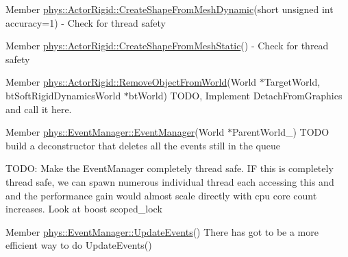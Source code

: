 \label{dd/da0/todo__todo000002}
\hypertarget{dd/da0/todo__todo000002}{}
 
\begin{DoxyDescription}
\item[Member \hyperlink{classphys_1_1ActorRigid_aab4a408ce0724be6adf4c9f51f55f8a1}{phys::ActorRigid::CreateShapeFromMeshDynamic}(short unsigned int accuracy=1) ]-\/ Check for thread safety 
\end{DoxyDescription}

\label{dd/da0/todo__todo000003}
\hypertarget{dd/da0/todo__todo000003}{}
 
\begin{DoxyDescription}
\item[Member \hyperlink{classphys_1_1ActorRigid_a84554dcaaf2475ba0ec7dcb9235050ac}{phys::ActorRigid::CreateShapeFromMeshStatic}() ]-\/ Check for thread safety 
\end{DoxyDescription}

\label{dd/da0/todo__todo000001}
\hypertarget{dd/da0/todo__todo000001}{}
 
\begin{DoxyDescription}
\item[Member \hyperlink{classphys_1_1ActorRigid_a74a4eaa5491b90a977e9db0457271f31}{phys::ActorRigid::RemoveObjectFromWorld}(World $\ast$TargetWorld, btSoftRigidDynamicsWorld $\ast$btWorld) ]TODO, Implement DetachFromGraphics and call it here. 
\end{DoxyDescription}

\label{dd/da0/todo__todo000008}
\hypertarget{dd/da0/todo__todo000008}{}
 
\begin{DoxyDescription}
\item[Member \hyperlink{classphys_1_1EventManager_a148f8c559642d3d50206169b3d0406be}{phys::EventManager::EventManager}(World $\ast$ParentWorld\_\-) ]TODO build a deconstructor that deletes all the events still in the queue 

TODO: Make the EventManager completely thread safe. IF this is completely thread safe, we can spawn numerous individual thread each accessing this and and the performance gain would almost scale directly with cpu core count increases. Look at boost scoped\_\-lock 
\end{DoxyDescription}

\label{dd/da0/todo__todo000006}
\hypertarget{dd/da0/todo__todo000006}{}
 
\begin{DoxyDescription}
\item[Member \hyperlink{classphys_1_1EventManager_a63cf23dc9fe0ced3e2c60ca61c97b166}{phys::EventManager::UpdateEvents}() ]There has got to be a more efficient way to do UpdateEvents() 
\end{DoxyDescription}

